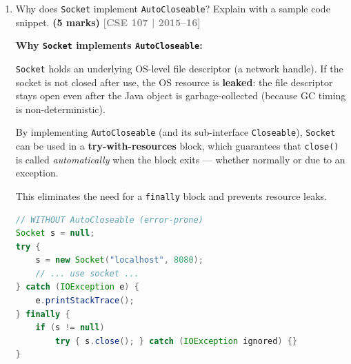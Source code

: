 \documentclass[12pt,a3paper]{article}
\newcommand{\yr}[1]{\hfill\textcolor{gray}{\small\textbf{[#1]}}}
\newcommand{\mk}[1]{\textcolor{orange!70!black}{\small\textbf{(#1 marks)}}}
\begin{document}
\begin{enumerate}
\begin{tcolorbox}[enhanced,breakable,ansbox,
  colback=cB!4,colframe=cB,boxrule=0.8pt,arc=5pt,
  title={\textbf{Answer — HttpURLConnection to
  www.google.com}},
  fonttitle=\bfseries\color{white},colbacktitle=cB]
\begin{verbatim}
--- Response Headers ---
null          : [HTTP/1.1 200 OK]
Content-Type  : [text/html; charset=UTF-8]
Cache-Control : [private, max-age=0]
Date          : [Mon, 01 Jan 2024 10:00:00 GMT]
Server        : [gws]
...
\end{verbatim}

\medskip
\textbf{Key classes:}
\begin{itemize}[itemsep=2pt]
  \item \texttt{URL} --- represents the resource
  address.
  \item \texttt{HttpURLConnection} --- subclass of
  \texttt{URLConnection}; provides HTTP-specific
  methods such as \texttt{getResponseCode()} and
  \texttt{getHeaderFields()}.
  \item \texttt{getHeaderFields()} returns a
  \texttt{Map<String, List<String>>} where
  \texttt{null} key holds the HTTP status line.
\end{itemize}

\end{tcolorbox}

\item Why does \texttt{Socket} implement \texttt{AutoCloseable}? Explain with a sample code snippet. \mk{5}
\yr{CSE 107 | 2015--16}


\begin{tcolorbox}[enhanced,breakable,ansbox,
  colback=cB!4,colframe=cB,boxrule=0.8pt,arc=5pt,
  title={\textbf{Answer — Why Socket Implements
  AutoCloseable}},
  fonttitle=\bfseries\color{white},colbacktitle=cB]

\textbf{Why \texttt{Socket} implements
\texttt{AutoCloseable}:}

\texttt{Socket} holds an underlying OS-level file
descriptor (a network handle). If the socket is not
closed after use, the OS resource is \textbf{leaked}:
the file descriptor stays open even after the Java
object is garbage-collected (because GC timing is
non-deterministic).

By implementing \texttt{AutoCloseable} (and its
sub-interface \texttt{Closeable}), \texttt{Socket}
can be used in a \textbf{try-with-resources} block,
which guarantees that \texttt{close()} is called
\emph{automatically} when the block exits --- whether
normally or due to an exception.

This eliminates the need for a \texttt{finally} block
and prevents resource leaks.

\begin{lstlisting}[language=Java]
// WITHOUT AutoCloseable (error-prone)
Socket s = null;
try {
    s = new Socket("localhost", 8080);
    // ... use socket ...
} catch (IOException e) {
    e.printStackTrace();
} finally {
    if (s != null)
        try { s.close(); } catch (IOException ignored) {}
}


\end{lstlisting}
\end{tcolorbox}
\end{enumerate}
\end{document}
